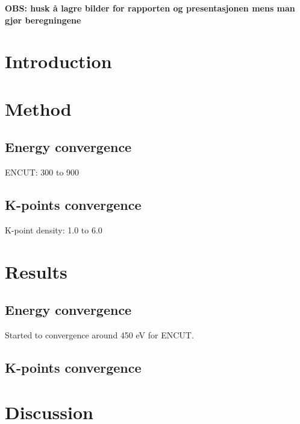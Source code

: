 \documentclass{article}
\begin{document}
\vspace{1cm}

\textbf{\large{OBS: husk å lagre bilder for rapporten og presentasjonen mens man gjør beregningene}}

\section{Introduction}  \label{sec:Introduction}

\vspace{1cm}

\section{Method}    \label{sec:Method}

  \subsection{Energy convergence}

    ENCUT: 300 to 900

  \subsection{K-points convergence}

    K-point density: 1.0 to 6.0

\vspace{1cm}

\section{Results}   \label{sec:Results}

  \subsection{Energy convergence}

    Started to convergence around 450 eV for ENCUT.

  \subsection{K-points convergence}






\vspace{1cm}

\section{Discussion}    \label{sec:Discussion}
\end{document}
